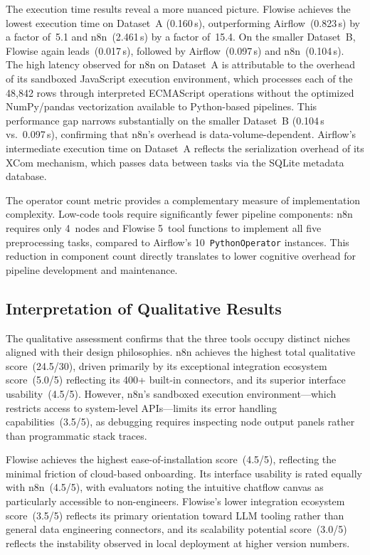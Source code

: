 \documentclass[journal]{IEEEtran}
\begin{document}
The execution time results reveal a more nuanced picture. Flowise
achieves the lowest execution time on Dataset~A (0.160\,s), outperforming
Airflow~(0.823\,s) by a factor of~5.1 and n8n~(2.461\,s) by a factor
of~15.4. On the smaller Dataset~B, Flowise again leads~(0.017\,s),
followed by Airflow~(0.097\,s) and n8n~(0.104\,s). The high latency
observed for n8n on Dataset~A is attributable to the overhead of its
sandboxed JavaScript execution environment, which processes each of the
48,842 rows through interpreted ECMAScript operations without the
optimized NumPy/pandas vectorization available to Python-based pipelines.
This performance gap narrows substantially on the smaller Dataset~B
(0.104\,s vs.\ 0.097\,s), confirming that n8n's overhead is
data-volume-dependent. Airflow's intermediate execution time on
Dataset~A reflects the serialization overhead of its XCom mechanism,
which passes data between tasks via the SQLite metadata database.

The operator count metric provides a complementary measure of
implementation complexity. Low-code tools require significantly fewer
pipeline components: n8n requires only 4~nodes and Flowise
5~tool functions to implement all five preprocessing tasks, compared
to Airflow's 10~\texttt{PythonOperator} instances. This reduction in
component count directly translates to lower cognitive overhead for
pipeline development and maintenance.

\subsection{Interpretation of Qualitative Results}

The qualitative assessment confirms that the three tools occupy
distinct niches aligned with their design philosophies. n8n achieves
the highest total qualitative score~(24.5/30), driven primarily by
its exceptional integration ecosystem score~(5.0/5) reflecting its
400+ built-in connectors, and its superior interface usability~(4.5/5).
However, n8n's sandboxed execution environment---which restricts access
to system-level APIs---limits its error handling capabilities~(3.5/5),
as debugging requires inspecting node output panels rather than
programmatic stack traces.

Flowise achieves the highest ease-of-installation score~(4.5/5),
reflecting the minimal friction of cloud-based onboarding. Its
interface usability is rated equally with n8n~(4.5/5), with evaluators
noting the intuitive chatflow canvas as particularly accessible to
non-engineers. Flowise's lower integration ecosystem score~(3.5/5)
reflects its primary orientation toward LLM tooling rather than general
data engineering connectors, and its scalability potential score~(3.0/5)
reflects the instability observed in local deployment at higher version
numbers.
\end{document}

